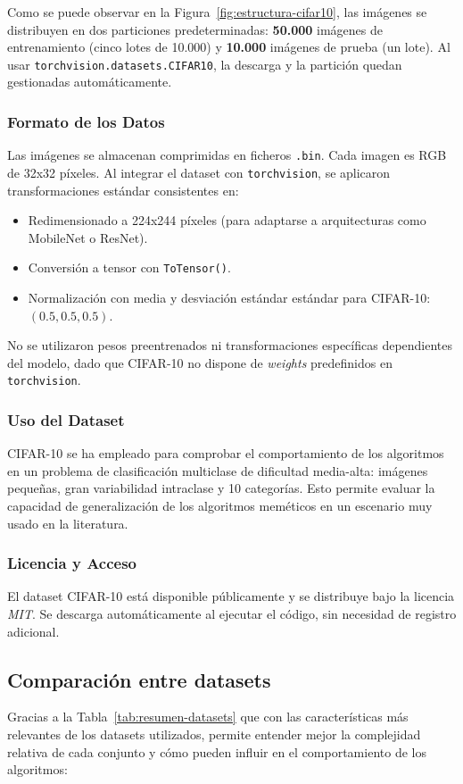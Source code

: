 Como se puede observar en la Figura~\ref{fig:estructura-cifar10},
las imágenes se distribuyen en dos particiones predeterminadas:
\textbf{50.000} imágenes de entrenamiento (cinco lotes de 10.000) y \textbf{10.000} imágenes de prueba (un lote).
Al usar \texttt{torchvision.datasets.CIFAR10}, la descarga y la partición quedan gestionadas automáticamente.

\subsubsection{Formato de los Datos}
Las imágenes se almacenan comprimidas en ficheros \texttt{.bin}.
Cada imagen es RGB de 32x32 píxeles.
Al integrar el dataset con \texttt{torchvision}, se aplicaron transformaciones estándar consistentes en:
\begin{itemize}
    \item Redimensionado a 224x244 píxeles (para adaptarse a arquitecturas como MobileNet o ResNet).
    \item Conversión a tensor con \texttt{ToTensor()}.
    \item Normalización con media y desviación estándar estándar para CIFAR-10: $(0.5, 0.5, 0.5)$.
\end{itemize}

No se utilizaron pesos preentrenados ni transformaciones específicas dependientes del modelo, dado que CIFAR-10 no dispone de \textit{weights} predefinidos en \texttt{torchvision}.

\subsubsection{Uso del Dataset}
CIFAR-10 se ha empleado para comprobar el comportamiento de los algoritmos en un problema de clasificación multiclase de dificultad media-alta:
imágenes pequeñas, gran variabilidad intraclase y 10 categorías.
Esto permite evaluar la capacidad de generalización de los algoritmos meméticos en un escenario muy usado en la literatura.

\subsubsection{Licencia y Acceso}
El dataset CIFAR-10 está disponible públicamente y se distribuye bajo la licencia \emph{MIT}.
Se descarga automáticamente al ejecutar el código, sin necesidad de registro adicional.


\subsection{Comparación entre datasets}\label{subsec:comparacion-entre-datasets}
Gracias a la Tabla~\ref{tab:resumen-datasets} que con las características más relevantes de los datasets utilizados,
permite entender mejor la complejidad relativa de cada conjunto y cómo pueden influir en el comportamiento de los algoritmos:

